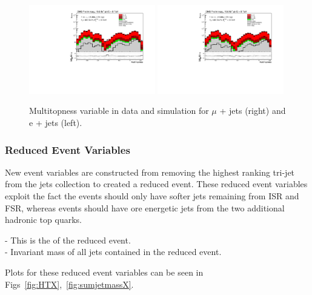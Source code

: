 \begin{figure}[!ht]
    \includegraphics[width=0.49\textwidth]{images/Run1/MultiTopness_Mu.pdf}
    \includegraphics[width=0.49\textwidth]{images/Run1/MultiTopness_e.pdf}
    \caption{Multitopness variable in data and simulation for $\mu$ + jets (right) and e + jets (left).}
    \label{fig:Multitopness}
\end{figure}

\subsubsection*{Reduced Event Variables}
New event variables are constructed from removing the highest ranking tri-jet from the jets collection to created a reduced event. These reduced event variables exploit the fact the \ttbar events should only have softer jets remaining from ISR and FSR, whereas \tttt events should have ore energetic jets from the two additional hadronic top quarks.

\textbf{\HTX} - This is the \HT of the reduced event.\\
\textbf{\sumjetmassX} - Invariant mass of all jets contained in the reduced event.

Plots for these reduced event variables can be seen in Figs~\ref{fig:HTX},~\ref{fig:sumjetmassX}.

